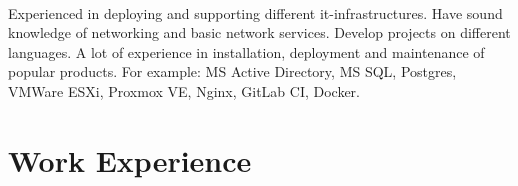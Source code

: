 \documentclass[letterpaper]{twentysecondcv} %
\begin{document}
\makeprofile %
{\Huge\headingfont\color{headercolor}\cvjobtitle}

\paragraph{}
Experienced in deploying and supporting different it-infrastructures.
Have sound knowledge of networking and basic network services.
Develop projects on different languages.
A lot of experience in installation, deployment and maintenance of popular products.
For example: MS Active Directory, MS SQL, Postgres, VMWare ESXi, Proxmox VE, Nginx, GitLab CI, Docker.


\section{Work Experience}
\end{document}
